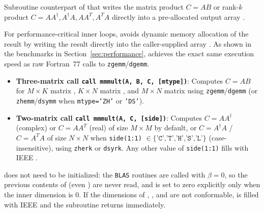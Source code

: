 Subroutine counterpart of  that writes the matrix product $C = A B$ or rank-$k$ product $C = A A^\dagger, A^\dagger A, A A^T, A^T A$ directly into a pre-allocated output array .

For performance-critical inner loops,  avoids dynamic memory allocation of the result by writing the result directly into the caller-supplied  array . As shown in the benchmarks in Section~\ref{sec:performance},  achieves the exact same execution speed as raw Fortran~77 calls to \texttt{zgemm}/\texttt{dgemm}.
\begin{itemize}
  \item \textbf{Three-matrix call \texttt{call mmmult(A, B, C, [mtype])}}: Computes $C = A B$ for $M\times K$ matrix , $K\times N$ matrix , and $M\times N$ matrix  using \texttt{zgemm}/\texttt{dgemm} (or \texttt{zhemm}/\texttt{dsymm} when \texttt{mtype='ZH'} or \texttt{'DS'}).
  \item \textbf{Two-matrix call \texttt{call mmmult(A, C, [side])}}: Computes $C = A A^\dagger$ (complex) or $C = A A^T$ (real) of size $M\times M$ by default, or $C = A^\dagger A$ / $C = A^T A$ of size $N\times N$ when \texttt{side(1:1)} $\in \{\texttt{'C','T','H','S','L'}\}$ (case-insensitive), using \texttt{zherk} or \texttt{dsyrk}. Any other value of \texttt{side(1:1)} fills  with IEEE .
\end{itemize}
 does not need to be initialized: the \texttt{BLAS} routines are called with $\beta=0$, so the previous contents of  (even ) are never read, and  is set to zero explicitly only when the inner dimension is $0$. If the dimensions of , , and  are not conformable,  is filled with IEEE  and the subroutine returns immediately.

\begin{description}[leftmargin=2.2cm, style=nextline]
\end{description}

